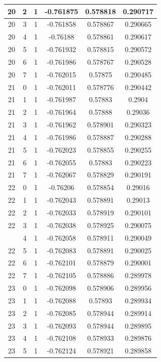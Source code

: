\documentclass[12pt,a4paper]{article}
\numberwithin{equation}{section}
\numberwithin{figure}{section}
\numberwithin{table}{section}
\begin{document}
\begin{longtable}{|c|c|c|c|c|c|}
20 & 2 & 1 & -0.761875 & 0.578818 & 0.290717 \\ \hline
20 & 3 & 1 & -0.761858 & 0.578867 & 0.290665 \\ \hline
20 & 4 & 1 & -0.76188 & 0.578861 & 0.290617 \\ \hline
20 & 5 & 1 & -0.761932 & 0.578815 & 0.290572 \\ \hline
20 & 6 & 1 & -0.761986 & 0.578767 & 0.290528 \\ \hline
20 & 7 & 1 & -0.762015 & 0.57875 & 0.290485 \\ \hline
21 & 0 & 1 & -0.762011 & 0.578776 & 0.290442 \\ \hline
21 & 1 & 1 & -0.761987 & 0.57883 & 0.2904 \\ \hline
21 & 2 & 1 & -0.761964 & 0.57888 & 0.29036 \\ \hline
21 & 3 & 1 & -0.761962 & 0.578901 & 0.290323 \\ \hline
21 & 4 & 1 & -0.761986 & 0.578887 & 0.290288 \\ \hline
21 & 5 & 1 & -0.762023 & 0.578855 & 0.290255 \\ \hline
21 & 6 & 1 & -0.762055 & 0.57883 & 0.290223 \\ \hline
21 & 7 & 1 & -0.762067 & 0.578829 & 0.290191 \\ \hline
22 & 0 & 1 & -0.76206 & 0.578854 & 0.29016 \\ \hline
22 & 1 & 1 & -0.762043 & 0.578891 & 0.29013 \\ \hline
22 & 2 & 1 & -0.762033 & 0.578919 & 0.290101 \\ \hline
22 & 3 & 1 & -0.762038 & 0.578925 & 0.290075 \\ \hline
\pagebreak
22 & 4 & 1 & -0.762058 & 0.578911 & 0.290049 \\ \hline
22 & 5 & 1 & -0.762083 & 0.578891 & 0.290025 \\ \hline
22 & 6 & 1 & -0.762101 & 0.578879 & 0.290001 \\ \hline
22 & 7 & 1 & -0.762105 & 0.578886 & 0.289978 \\ \hline
23 & 0 & 1 & -0.762098 & 0.578906 & 0.289956 \\ \hline
23 & 1 & 1 & -0.762088 & 0.57893 & 0.289934 \\ \hline
23 & 2 & 1 & -0.762085 & 0.578944 & 0.289914 \\ \hline
23 & 3 & 1 & -0.762093 & 0.578944 & 0.289895 \\ \hline
23 & 4 & 1 & -0.762108 & 0.578933 & 0.289876 \\ \hline
23 & 5 & 1 & -0.762124 & 0.578921 & 0.289858 \\ \hline

\end{longtable}
\end{document}
